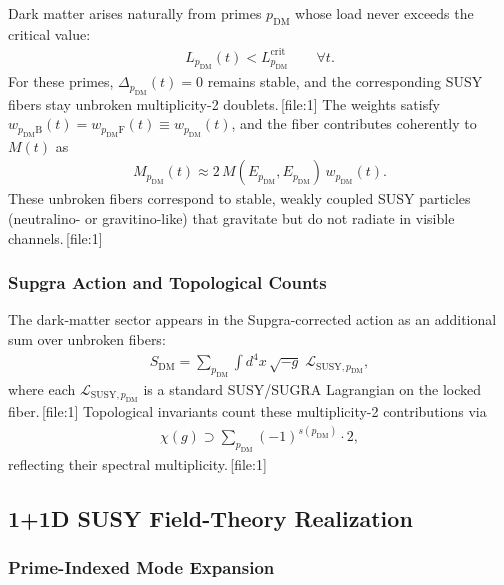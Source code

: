\documentclass[11pt]{article}
\begin{document}
Dark matter arises naturally from primes \(p_{\mathrm{DM}}\) whose load never exceeds the critical value:
\begin{align}
L_{p_{\mathrm{DM}}}(t) < L_{p_{\mathrm{DM}}}^{\mathrm{crit}}\qquad \forall t.
\end{align}
For these primes, \(\Delta_{p_{\mathrm{DM}}}(t)=0\) remains stable, and the corresponding SUSY fibers stay unbroken multiplicity-2 doublets.\,[file:1] The weights satisfy \(w_{p_{\mathrm{DM}}\mathrm{B}}(t)=w_{p_{\mathrm{DM}}\mathrm{F}}(t)\equiv w_{p_{\mathrm{DM}}}(t)\), and the fiber contributes coherently to \(M(t)\) as
\begin{align}
M_{p_{\mathrm{DM}}}(t)\approx 2\,M(E_{p_{\mathrm{DM}}},E_{p_{\mathrm{DM}}})\,w_{p_{\mathrm{DM}}}(t).
\end{align}
These unbroken fibers correspond to stable, weakly coupled SUSY particles (neutralino- or gravitino-like) that gravitate but do not radiate in visible channels.\,[file:1]

\subsubsection{Supgra Action and Topological Counts}

The dark-matter sector appears in the Supgra-corrected action as an additional sum over unbroken fibers:
\begin{align}
S_{\mathrm{DM}}
=
\sum_{p_{\mathrm{DM}}}
\int d^4x\,\sqrt{-g}\;
\mathcal{L}_{\mathrm{SUSY},p_{\mathrm{DM}}},
\end{align}
where each \(\mathcal{L}_{\mathrm{SUSY},p_{\mathrm{DM}}}\) is a standard SUSY/SUGRA Lagrangian on the locked fiber.\,[file:1] Topological invariants count these multiplicity-2 contributions via
\begin{align}
\chi(g)\supset\sum_{p_{\mathrm{DM}}}(-1)^{s(p_{\mathrm{DM}})}\cdot 2,
\end{align}
reflecting their spectral multiplicity.\,[file:1]

\subsection{1+1D SUSY Field-Theory Realization}

\subsubsection{Prime-Indexed Mode Expansion}
\end{document}
